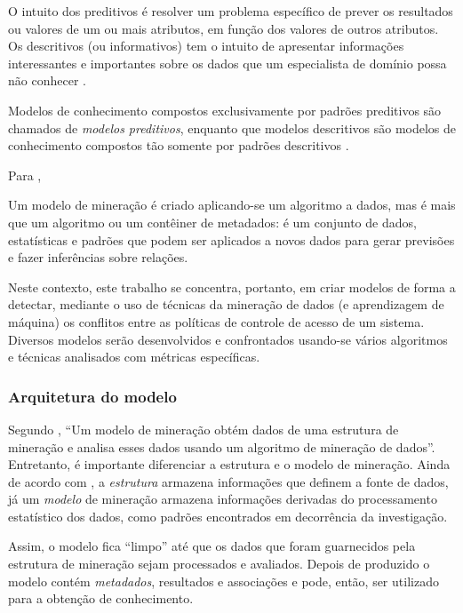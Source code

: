 O intuito dos preditivos é resolver um problema específico de prever os resultados ou valores de um ou mais atributos, em função dos valores de outros atributos. Os descritivos (ou informativos) tem o intuito de apresentar informações interessantes e importantes sobre os dados que um especialista de domínio possa não conhecer \cite{goldschmidt2005}. 

Modelos de conhecimento compostos exclusivamente por padrões preditivos são chamados de \textit{modelos preditivos}, enquanto que modelos descritivos são modelos de conhecimento compostos tão somente por padrões descritivos \cite{Boscarioli2017}.

Para , 
\begin{citacao}
	Um modelo de mineração é criado aplicando-se um algoritmo a dados, mas é mais que um algoritmo ou um contêiner de metadados: é um conjunto de dados, estatísticas e padrões que podem ser aplicados a novos dados para gerar previsões e fazer inferências sobre relações.
\end{citacao}

Neste contexto, este trabalho se concentra, portanto, em criar modelos de forma a detectar, mediante o uso de técnicas da mineração de dados (e aprendizagem de máquina) os conflitos entre as políticas de controle de acesso de um sistema. Diversos modelos serão desenvolvidos e confrontados usando-se vários algoritmos e técnicas analisados com métricas específicas.

\subsubsection{Arquitetura do modelo}\label{arquitetura_modelo}

Segundo , ``Um modelo de mineração obtém dados de uma estrutura de mineração e analisa esses dados usando um algoritmo de mineração de dados''. Entretanto, é importante diferenciar a estrutura e o modelo de mineração. Ainda de acordo com , a \textit{estrutura} armazena informações que definem a fonte de dados, já um \textit{modelo} de mineração armazena informações derivadas do processamento estatístico dos dados, como padrões encontrados em decorrência da investigação.

Assim, o modelo fica ``limpo'' até que os dados que foram guarnecidos pela estrutura de mineração sejam processados e avaliados. Depois de produzido o modelo contém \textit{metadados}, resultados e associações e pode, então, ser utilizado para a obtenção de conhecimento.

